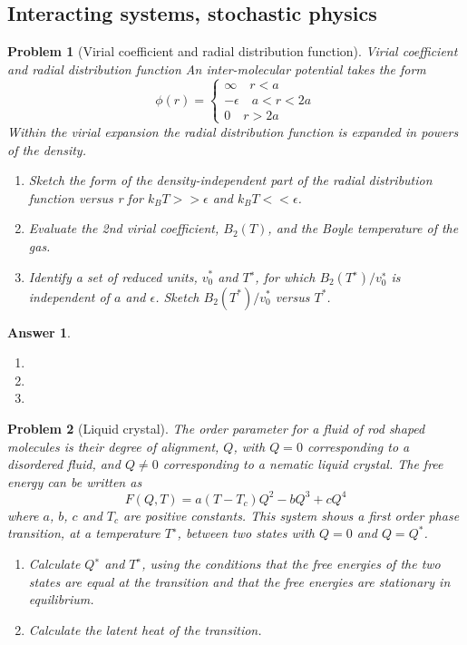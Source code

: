 \documentclass[a4paper]{article}
\newtheorem{ans}{Answer}[section]
\theoremstyle{new}
\newtheorem{qns}{Problem}[section]
\begin{document}
\subsection*{Interacting systems, stochastic physics}
\begin{qns}[Virial coefficient and radial distribution function]
Virial coefficient and radial distribution function An inter-molecular potential takes the form
\begin{equation*}
  \phi(r) = \begin{cases}
        \infty\quad r<a        \\
        -\epsilon\quad a<r<2a\\
        0\quad r>2a
        \end{cases}
 \end{equation*}
Within the virial expansion the radial distribution function is expanded in powers of the density. 
\begin{enumerate}[label=(\alph*)]
\item Sketch the form of the density-independent part of the radial distribution function versus r for $k_BT>>\epsilon$ and $k_BT<<\epsilon$. 
\item Evaluate the 2nd virial coefficient, $B_2(T)$, and the Boyle temperature of the gas. 
\item Identify a set of reduced units, $v_0^*$ and $T^∗$, for which $B_2(T^∗)/v^∗_0$ is independent of $a$ and $\epsilon$. Sketch $B_2(T^*)/v_0^*$ versus $T^*$.
\end{enumerate}
\end{qns}
\begin{ans}\leavevmode
\begin{enumerate}[label=(\alph*)]
\item 

\item 

\item 

\end{enumerate}
\end{ans}
\newpage
\begin{qns}[Liquid crystal]
The order parameter for a fluid of rod shaped molecules is their degree of alignment, $Q$, with $Q = 0$ corresponding to a disordered fluid, and $Q\neq 0$ corresponding to a nematic liquid crystal. The free energy can be written as
$$F(Q,T)=a(T-T_c)Q^2-bQ^3+cQ^4$$
where $a$, $b$, $c$ and $T_c$ are positive constants. This system shows a first order phase transition, at a temperature $T^∗$, between two states with $Q = 0$ and $Q = Q^*$.
\begin{enumerate}[label=(\alph*)]
\item Calculate $Q^∗$ and $T^∗$, using the conditions that the free energies of the two states are equal at the transition and that the free energies are stationary in equilibrium.
\item Calculate the latent heat of the transition.
\end{enumerate}
\end{qns}
\end{document}
